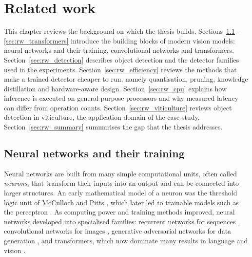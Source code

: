 \documentclass[a4paper,11pt,twoside]{report}
\theoremstyle{definition}
\begin{document}



\chapter{Related work}
\label{ch:related_work}

This chapter reviews the background on which the thesis builds. Sections~\ref{sec:rw_nn}--\ref{sec:rw_transformers} introduce the building blocks of modern vision models: neural networks and their training, convolutional networks and transformers. Section~\ref{sec:rw_detection} describes object detection and the detector families used in the experiments. Section~\ref{sec:rw_efficiency} reviews the methods that make a trained detector cheaper to run, namely quantisation, pruning, knowledge distillation and hardware-aware design. Section~\ref{sec:rw_cpu} explains how inference is executed on general-purpose processors and why measured latency can differ from operation counts. Section~\ref{sec:rw_viticulture} reviews object detection in viticulture, the application domain of the case study. Section~\ref{sec:rw_summary} summarises the gap that the thesis addresses.

\section{Neural networks and their training}
\label{sec:rw_nn}

Neural networks are built from many simple computational units, often called \emph{neurons}, that transform their inputs into an output and can be connected into larger structures. An early mathematical model of a neuron was the threshold logic unit of McCulloch and Pitts \cite{McCullochPitts1943}, which later led to trainable models such as the perceptron \cite{Rosenblatt1958Perceptron}. As computing power and training methods improved, neural networks developed into specialised families: recurrent networks for sequences \cite{Hochreiter1997LSTM}, convolutional networks for images \cite{LeCun1998GradientBased}, generative adversarial networks for data generation \cite{Goodfellow2014GAN}, and transformers, which now dominate many results in language and vision \cite{Vaswani2017Attention}.
\end{document}
